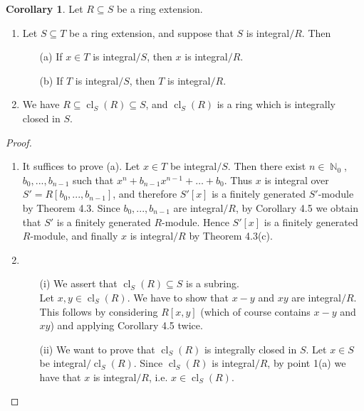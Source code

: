 \documentclass[12pt,a4paper]{report}
\theoremstyle{definition}
\newtheorem{corollary}[theorem]{Corollary} %
\theoremstyle{num.custom-title}
\DeclareMathOperator{\N}{\mathbb{N}}
\DeclareMathOperator{\sse}{\subseteq}
\DeclareMathOperator{\cl}{cl}
\begin{document}
\begin{corollary}
Let $R \sse S$ be a ring extension.
\begin{enumerate}
\item Let $S \sse T$ be a ring extension, and suppose that $S$ is integral$/R$. Then
\begin{itemize}
\item[(a)] If $x \in T$ is integral$/S$, then $x$ is integral$/R$.
\item[(b)] If $T$ is integral$/S$, then $T$ is integral$/R$.
\end{itemize}
\item We have $R \sse \cl_S(R) \sse S$, and $\cl_S(R)$ is a ring which is integrally closed in $S$.
\end{enumerate}
\begin{proof}\ 
\begin{enumerate}
\item It suffices to prove (a). Let $x \in T$ be integral$/S$. Then there exist $n \in \N_0$, $b_0,...,b_{n-1}$ such that $x^n+b_{n-1}x^{n-1} + \ldots + b_0$. Thus $x$ is integral over $S'=R[b_0,...,b_{n-1}]$, and therefore $S'[x]$ is a finitely generated $S'$-module by Theorem 4.3. Since $b_0,...,b_{n-1}$ are integral$/R$, by Corollary 4.5 we obtain that $S'$ is a finitely generated $R$-module. Hence $S'[x]$ is a finitely generated $R$-module, and finally $x$ is integral$/R$ by Theorem 4.3(c).
\item
\begin{itemize}
\item[(i)] We assert that $\cl_S(R) \sse S$ is a subring.\\
Let $x,y \in \cl_S(R)$. We have to show that $x-y$ and $xy$ are integral$/R$. This follows by considering $R[x,y]$ (which of course contains $x-y$ and $xy$) and applying Corollary 4.5 twice.
\item[(ii)] We want to prove that $\cl_S(R)$ is integrally closed in $S$. Let $x \in S$ be integral$/\cl_S(R)$. Since $\cl_S(R)$ is integral$/R$, by point 1(a) we have that $x$ is integral$/R$, i.e. $x \in \cl_S(R)$.
\end{itemize}
\end{enumerate}
\end{proof}
\end{corollary}
\end{document}
